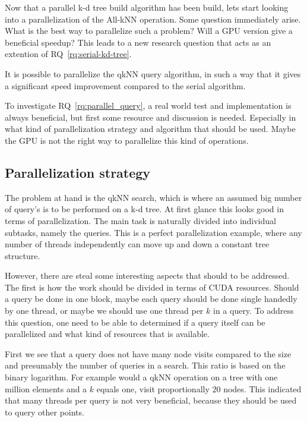 





Now that a parallel k-d tree build algorithm has been build, lets start looking into a parallelization of the All-kNN operation. Some question immediately arise. What is the best way to parallelize such a problem? Will a GPU version give a beneficial speedup? This leads to a new research question that acts as an extention of RQ~\ref{rq:serial-kd-tree}.


\begin{myrq}
\label{rq:parallel_query}
    It is possible to parallelize the qkNN query algorithm, in such a way that it gives a significant speed improvement compared to the serial algorithm.
\end{myrq}


To investigate RQ~\ref{rq:parallel_query}, a real world test and implementation is always beneficial, but first some resource and discussion is needed. Especially in what kind of parallelization strategy and algorithm that should be used. Maybe the GPU is not the right way to parallelize this kind of operations.


\subsection{Parallelization strategy} %
\label{sub:parallelization_strategy}


The problem at hand is the qkNN search, which is where an assumed big number of query's is to be performed on a k-d tree. At first glance this looks good in terms of parallelization. The main task is naturally divided into individual subtasks, namely the queries. This is a perfect parallelization example, where any number of threads independently can move up and down a constant tree structure.

However, there are steal some interesting aspects that should to be addressed. The first is how the work should be divided in terms of CUDA resources. Should a query be done in one block, maybe each query should be done single handedly by one thread, or maybe we should use one thread per $k$ in a query. To address this question, one need to be able to determined if a query itself can be parallelized and what kind of resources that is available.

First we see that a query does not have many node visits compared to the size and presumably the number of queries in a search. This ratio is based on the binary logarithm. For example would a qkNN operation on a tree with one million elements and a $k$ equals one, visit proportionally $20$ nodes. This indicated that many threads per query is not very beneficial, because they should be used to query other points. 

